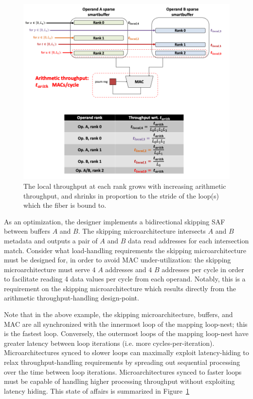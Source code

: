 \begin{itemize}
    \begin{figure}[H]
        \centering
        \includegraphics[width=\linewidth]{figures/local_throughput_diagram.png}
        \caption{The local throughput at each rank grows with increasing arithmetic throughput, and shrinks in proportion to the stride of the loop(s) which the fiber is bound to.}
        \label{fig:local_throughput_diagram}
    \end{figure}

    As an optimization, the designer implements a bidirectional skipping SAF between buffers $A$ and $B$. The skipping microarchitecture intersects $A$ and $B$ metadata and outputs a pair of $A$ and $B$ data read addresses for each intersection match. Consider what load-handling requirements the skipping microarchitecture must be designed for, in order to avoid MAC under-utilization: the skipping microarchitecture must serve $4$ $A$ addresses and $4$ $B$ addresses per cycle in order to facilitate reading 4 data values per cycle from each operand. Notably, this is a requirement on the skipping microarchitecture which results directly from the arithmetic throughput-handling design-point.

    Note that in the above example, the skipping microarchitecture, buffers, and MAC are all synchronized with the innermost loop of the mapping loop-nest; this is the fastest loop. Conversely, the outermost loops of the mapping loop-nest have greater latency between loop iterations (i.e. more cycles-per-iteration). Microarchitectures synced to slower loops can maximally exploit latency-hiding to relax throughput-handling requirements by spreading out sequential processing over the time between loop iterations. Microarchitectures synced to faster loops must be capable of handling higher processing throughput without exploiting latency hiding. This state of affairs is summarized in Figure~\ref{fig:local_throughput_diagram}
    

\end{itemize}
